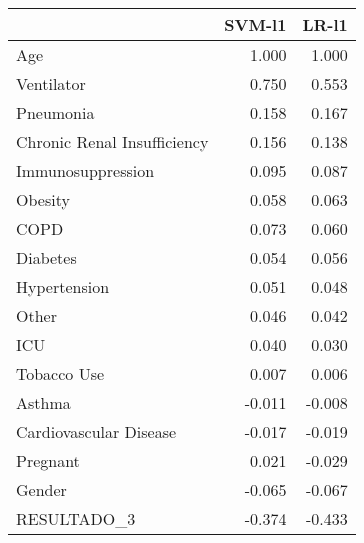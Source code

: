 \begin{tabular}{lrr}
\toprule
{} &  SVM-l1 &  LR-l1 \\
\midrule
Age                         &   1.000 &  1.000 \\
Ventilator                  &   0.750 &  0.553 \\
Pneumonia                   &   0.158 &  0.167 \\
Chronic Renal Insufficiency &   0.156 &  0.138 \\
Immunosuppression           &   0.095 &  0.087 \\
Obesity                     &   0.058 &  0.063 \\
COPD                        &   0.073 &  0.060 \\
Diabetes                    &   0.054 &  0.056 \\
Hypertension                &   0.051 &  0.048 \\
Other                       &   0.046 &  0.042 \\
ICU                         &   0.040 &  0.030 \\
Tobacco Use                 &   0.007 &  0.006 \\
Asthma                      &  -0.011 & -0.008 \\
Cardiovascular Disease      &  -0.017 & -0.019 \\
Pregnant                    &   0.021 & -0.029 \\
Gender                      &  -0.065 & -0.067 \\
RESULTADO\_3                 &  -0.374 & -0.433 \\
\bottomrule
\end{tabular}
